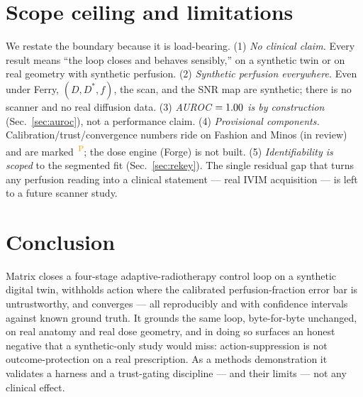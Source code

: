 \documentclass[12pt]{iopart}
\newcommand{\PROV}{\textsuperscript{\textcolor{orange}{\,P}}}
\newcommand{\Dstar}{D^{*}}
\newcommand{\fq}{f}          %
\begin{document}
\section{Scope ceiling and limitations}\label{sec:scope}
We restate the boundary because it is load-bearing. (1) \emph{No clinical claim.} Every
result means ``the loop closes and behaves sensibly,'' on a synthetic twin or on real
geometry with synthetic perfusion. (2) \emph{Synthetic perfusion everywhere.} Even under
Ferry, $(D,\Dstar,\fq)$, the scan, and the SNR map are synthetic; there is no scanner and
no real diffusion data. (3) \emph{AUROC $=1.00$ is by construction}
(Sec.~\ref{sec:auroc}), not a performance claim. (4) \emph{Provisional components.}
Calibration/trust/convergence numbers ride on Fashion and Minos (in review) and are marked
\PROV; the dose engine (Forge) is not built. (5) \emph{Identifiability is scoped} to the
segmented fit (Sec.~\ref{sec:rekey}). The single residual gap that turns any perfusion
reading into a clinical statement --- real IVIM acquisition --- is left to a future scanner
study.

\section{Conclusion}\label{sec:conclusion}
Matrix closes a four-stage adaptive-radiotherapy control loop on a synthetic digital twin,
withholds action where the calibrated perfusion-fraction error bar is untrustworthy, and
converges --- all reproducibly and with confidence intervals against known ground truth. It
grounds the same loop, byte-for-byte unchanged, on real anatomy and real dose geometry, and
in doing so surfaces an honest negative that a synthetic-only study would miss:
action-suppression is not outcome-protection on a real prescription. As a methods
demonstration it validates a harness and a trust-gating discipline --- and their limits ---
not any clinical effect.

\end{document}
